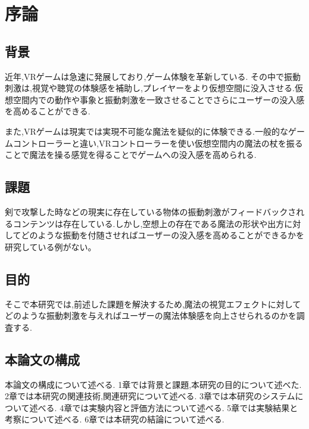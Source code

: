 \chapter{序論}
\section{背景}
近年,VRゲームは急速に発展しており,ゲーム体験を革新している.
その中で振動刺激は,視覚や聴覚の体験感を補助し,プレイヤーをより仮想空間に没入させる.仮想空間内での動作や事象と振動刺激を一致させることでさらにユーザーの没入感を高めることができる.

また,VRゲームは現実では実現不可能な魔法を疑似的に体験できる.一般的なゲームコントローラーと違い,VRコントローラーを使い仮想空間内の魔法の杖を振ることで魔法を操る感覚を得ることでゲームへの没入感を高められる.

\section{課題}
剣で攻撃した時などの現実に存在している物体の振動刺激がフィードバックされるコンテンツは存在している.しかし,空想上の存在である魔法の形状や出方に対してどのような振動を付随させればユーザーの没入感を高めることができるかを研究している例がない。

\section{目的}
そこで本研究では,前述した課題を解決するため,魔法の視覚エフェクトに対してどのような振動刺激を与えればユーザーの魔法体験感を向上させられるのかを調査する.

\section{本論文の構成}
本論文の構成について述べる.
1章では背景と課題,本研究の目的について述べた.
2章では本研究の関連技術,関連研究について述べる.
3章では本研究のシステムについて述べる.
4章では実験内容と評価方法について述べる.
5章では実験結果と考察について述べる.
6章では本研究の結論について述べる.




\begin{comment}
    \textblockcolour{PowderBlue}
    \begin{textblock}{10}(6.5, 15.8)
        見出しの深さの最大値は研究室や分野によって異なる。
        
        教員の指示に従うこと。一般論として4段は深すぎ？
    \end{textblock}
\end{comment}
